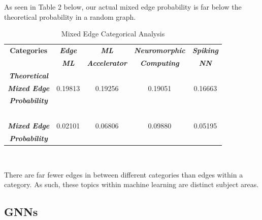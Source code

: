 \documentclass[conference]{IEEEtran}
\begin{document}
As seen in Table 2 below, our actual mixed edge probability is far 
below the theoretical probability in a random graph. \par

\begin{table}[htbp]
    \caption{Mixed Edge Categorical Analysis}
    \begin{center}
        \begin{tabular}{|c|cccc|}
        \hline
        \textbf{Categories} & \textbf{\textit{Edge}} & \textbf{\textit{ML}} & 
        \textbf{\textit{Neuromorphic}} & \textbf{\textit{Spiking}} \\
        \textbf{} & \textbf{\textit{ML}} & \textbf{\textit{Accelerator}} & 
        \textbf{\textit{Computing}} & \textbf{\textit{NN}} \\
        \hline
        \textbf{\textit{Theoretical}} &\ &\ &\ &\ \\
        \textbf{\textit{Mixed Edge}} &
        0.19813& 0.19256& 0.19051& 0.16663 \\
        \textbf{\textit{Probability}} & \ &\ &\ &\ \\
        \ & \ &\ &\ &\ \\
        \textbf{\textit{Mixed Edge}} & 
        0.02101& 0.06806& 0.09880& 0.05195 \\
        \textbf{\textit{Probability}} & \ &\ &\ &\ \\
        \hline
        \end{tabular}
        \label{tab2}
    \end{center}
\end{table}

\ \newline
\ \newline
\ \newline
\ \newline
\ \newline
\ \newline

There are far fewer edges in between different categories than edges within a category. 
As such, these topics within machine learning are distinct subject areas. \par

\subsection{GNNs}
\end{document}
